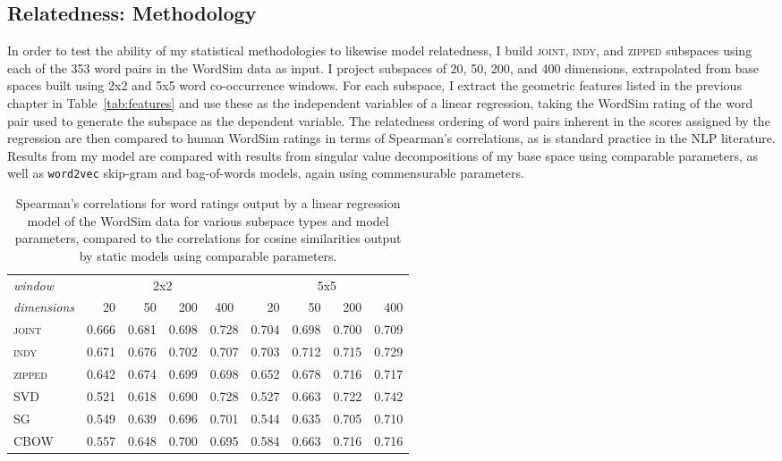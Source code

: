 \subsection{Relatedness: Methodology}
In order to test the ability of my statistical methodologies to likewise model relatedness, I build \textsc{joint}, \textsc{indy}, and \textsc{zipped} subspaces using each of the 353 word pairs in the WordSim data as input.  I project subspaces of 20, 50, 200, and 400 dimensions, extrapolated from base spaces built using 2x2 and 5x5 word co-occurrence windows.  For each subspace, I extract the geometric features listed in the previous chapter in Table~\ref{tab:features} and use these as the independent variables of a linear regression, taking the WordSim rating of the word pair used to generate the subspace as the dependent variable.  The relatedness ordering of word pairs inherent in the scores assigned by the regression are then compared to human WordSim ratings in terms of Spearman's correlations, as is standard practice in the NLP literature.  Results from my model are compared with results from singular value decompositions of my base space using comparable parameters, as well as \texttt{word2vec} skip-gram and bag-of-words models, again using commensurable parameters.

\begin{table}
\centering
\begin{tabular}{lrrrr|rrrr}
\hline
\emph{window} & \multicolumn{4}{c}{2x2} & \multicolumn{4}{c}{5x5} \\
\emph{dimensions} & 20 & 50 & 200 & \multicolumn{1}{c}{400} & 20 & 50 & 200 & 400 \\
\hline
\textsc{joint} & 0.666 & 0.681 & 0.698 & 0.728 & 0.704 & 0.698 & 0.700 & 0.709 \\
\textsc{indy} & 0.671 & 0.676 & 0.702 & 0.707 & 0.703 & 0.712 & 0.715 & 0.729 \\
\textsc{zipped} & 0.642 & 0.674 & 0.699 & 0.698 & 0.652 & 0.678 & 0.716 & 0.717 \\
\textsc{SVD} & 0.521 & 0.618 & 0.690 & 0.728 & 0.527 & 0.663 & 0.722 & 0.742 \\
\textsc{SG} & 0.549 & 0.639 & 0.696 & 0.701 & 0.544 & 0.635 & 0.705 & 0.710 \\
\textsc{CBOW} & 0.557 & 0.648 & 0.700 & 0.695 & 0.584 & 0.663 & 0.716 & 0.716 \\
\hline
\end{tabular}
\caption{Spearman's correlations for word ratings output by a linear regression model of the WordSim data for various subspace types and model parameters, compared to the correlations for cosine similarities output by static models using comparable parameters.}
\label{tab:related}
\end{table}

